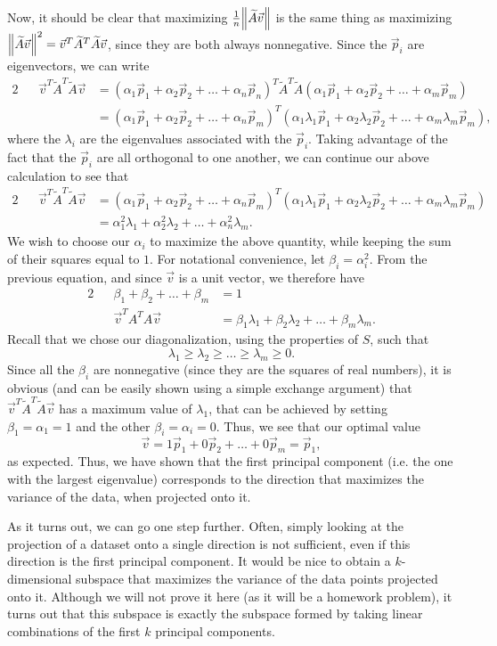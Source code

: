\documentclass[letterpaper]{article}
\theoremstyle{remark}
\renewcommand{\tilde}[1]{\widetilde{#1}}
\newcommand{\eqn}[1]{\begin{alignat*}{2}#1\end{alignat*}}
\begin{document}
Now, it should be clear that maximizing $\frac{1}{n}\norm{\tilde{A}\vec{v}}$ is the same thing as maximizing $\norm{\tilde{A}\vec{v}}^2 = \vec{v}^T\tilde{A}^T\tilde{A}\vec{v}$, since they are both always nonnegative. Since the $\vec{p}_i$ are eigenvectors, we can write
\eqn{
    && \vec{v}^T\tilde{A}^T\tilde{A}\vec{v} &= (\alpha_1 \vec{p}_1 + \alpha_2 \vec{p}_2 + \ldots + \alpha_n \vec{p}_n)^T\tilde{A}^T\tilde{A}(\alpha_1 \vec{p}_1 + \alpha_2 \vec{p}_2 + \ldots + \alpha_m \vec{p}_m) \\
    &&&= (\alpha_1 \vec{p}_1 + \alpha_2 \vec{p}_2 + \ldots + \alpha_n \vec{p}_m)^T(\alpha_1 \lambda_1 \vec{p}_1 + \alpha_2 \lambda_2 \vec{p}_2 + \ldots + \alpha_m \lambda_m \vec{p}_m),
}
where the $\lambda_i$ are the eigenvalues associated with the $\vec{p}_i$. Taking advantage of the fact that the $\vec{p}_i$ are all orthogonal to one another, we can continue our above calculation to see that
\eqn{
    && \vec{v}^T\tilde{A}^T\tilde{A}\vec{v} &= (\alpha_1 \vec{p}_1 + \alpha_2 \vec{p}_2 + \ldots + \alpha_n \vec{p}_m)^T(\alpha_1 \lambda_1 \vec{p}_1 + \alpha_2 \lambda_2 \vec{p}_2 + \ldots + \alpha_m \lambda_m \vec{p}_m) \\
    &&&= \alpha_1^2 \lambda_1 + \alpha_2^2 \lambda_2 + \ldots + \alpha_n^2 \lambda_m.
}
We wish to choose our $\alpha_i$ to maximize the above quantity, while keeping the sum of their squares equal to $1$. For notational convenience, let $\beta_i = \alpha_i^2$. From the previous equation, and since $\vec{v}$ is a unit vector, we therefore have
\eqn{
    && \beta_1 + \beta_2 + \ldots + \beta_m &= 1 \\
    && \vec{v}^TA^TA\vec{v} &= \beta_1\lambda_1 + \beta_2\lambda_2 + \ldots + \beta_m\lambda_m.
}
Recall that we chose our diagonalization, using the properties of $S$, such that
\[
    \lambda_1 \ge \lambda_2 \ge \ldots \ge \lambda_m \ge 0.
\]
Since all the $\beta_i$ are nonnegative (since they are the squares of real numbers), it is obvious (and can be easily shown using a simple exchange argument) that $\vec{v}^T\tilde{A}^T\tilde{A}\vec{v}$ has a maximum value of $\lambda_1$, that can be achieved by setting $\beta_1 = \alpha_1 = 1$ and the other $\beta_i = \alpha_i = 0$. Thus, we see that our optimal value
\[
    \vec{v} = 1 \vec{p}_1 + 0 \vec{p}_2 + \ldots + 0 \vec{p}_m = \vec{p}_1,
\]
as expected. Thus, we have shown that the first principal component (i.e. the one with the largest eigenvalue) corresponds to the direction that maximizes the variance of the data, when projected onto it.

As it turns out, we can go one step further. Often, simply looking at the projection of a dataset onto a single direction is not sufficient, even if this direction is the first principal component. It would be nice to obtain a $k$-dimensional subspace that maximizes the variance of the data points projected onto it. Although we will not prove it here (as it will be a homework problem), it turns out that this subspace is exactly the subspace formed by taking linear combinations of the first $k$ principal components.
\end{document}
